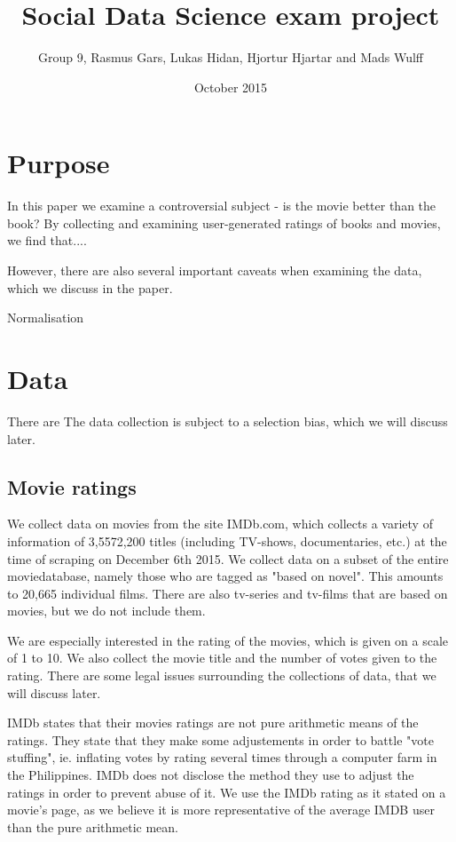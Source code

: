 \documentclass[12pt]{article}
\title{Social Data Science exam project}
\author{Group 9, Rasmus Gars, Lukas Hidan, Hjortur Hjartar and Mads Wulff}
\date{October 2015}
\begin{document}
\maketitle

	\section{Purpose} %
	\label{sec:problem_1}
	In this paper we examine a controversial subject - is the movie better than the book? By collecting and examining user-generated ratings of books and movies, we find that....

	However, there are also several important caveats when examining the data, which we discuss in the paper. 

	Normalisation 



\section{Data} %
	\label{sec:data}

There are The data collection is subject to a selection bias, which we will discuss later.

\subsection{Movie ratings}
We collect data on movies from the site IMDb.com, which collects a variety of information  of 3,5572,200 titles (including TV-shows, documentaries, etc.) at the time of scraping on December 6th 2015. We collect data on a subset of the entire moviedatabase, namely those who are tagged as "based on novel". This amounts to 20,665 individual films. There are also tv-series and tv-films that are based on movies, but we do not include them.

We are especially interested in the rating of the movies, which is given on a scale of 1 to 10. We also collect the movie title and the number of votes given to the rating. There are some legal issues surrounding the collections of data, that we will discuss later.

IMDb states that their movies ratings are not pure arithmetic means of the ratings. They state that they make some adjustements in order to battle "vote stuffing", ie. inflating votes by rating several times through a computer farm in the Philippines. IMDb does not disclose the method they use to adjust the ratings in order to prevent abuse of it. We use the IMDb rating as it stated on a movie's page, as we believe it is more representative of the average IMDB user than the pure arithmetic mean.
\end{document}
